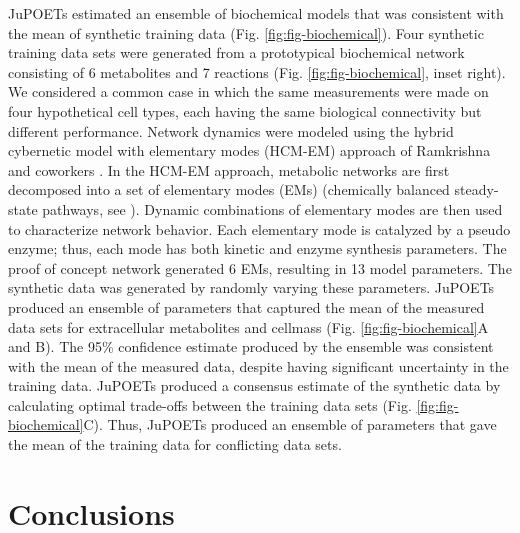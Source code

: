 \documentclass{bmcart}
\begin{document}
JuPOETs estimated an ensemble of biochemical models that was consistent with the mean of synthetic training data (Fig. \ref{fig:fig-biochemical}).
Four synthetic training data sets were generated from a prototypical biochemical network consisting of 6 metabolites and 7 reactions (Fig. \ref{fig:fig-biochemical}, inset right).
We considered a common case in which the same measurements were made on four hypothetical cell types, each having the same biological connectivity but different performance.
Network dynamics were modeled using the hybrid cybernetic model with elementary modes (HCM-EM) approach of Ramkrishna and coworkers \cite{2008_kim_varner_ramkrishna_BiotechProg}.
In the HCM-EM approach, metabolic networks are first decomposed into a set of elementary modes (EMs) (chemically balanced steady-state pathways, see \cite{Schuster:2000aa}).
Dynamic combinations of elementary modes are then used to characterize network behavior.
Each elementary mode is catalyzed by a pseudo enzyme; thus, each mode has both kinetic and enzyme synthesis parameters.
The proof of concept network generated 6 EMs, resulting in 13 model parameters.
The synthetic data was generated by randomly varying these parameters.
JuPOETs produced an ensemble of parameters that captured the mean of the measured data sets for extracellular metabolites and cellmass
(Fig. \ref{fig:fig-biochemical}A and B). The 95\% confidence estimate produced by the ensemble was consistent with the mean of the measured data, despite having significant
uncertainty in the training data. JuPOETs produced a consensus estimate of the synthetic data by calculating optimal trade-offs between the training data sets (Fig. \ref{fig:fig-biochemical}C). Thus, JuPOETs produced an ensemble of parameters that gave the mean of the training data for conflicting data sets.

\section*{Conclusions}
\end{document}
